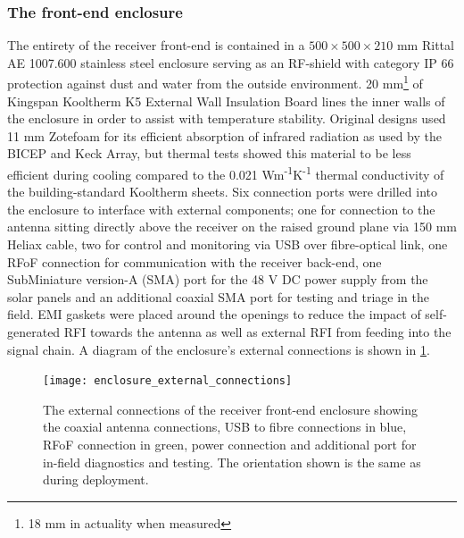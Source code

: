 \subsubsection{The front-end enclosure}
The entirety of the receiver front-end is contained in a $500 \times 500 \times 210$ mm Rittal AE 1007.600 stainless steel enclosure serving as an RF-shield with category IP 66 protection against dust and water from the outside environment. 20 mm\footnote{18 mm in actuality when measured} of Kingspan Kooltherm K5 External Wall Insulation Board lines the inner walls of the enclosure in order to assist with temperature stability. Original designs used 11 mm Zotefoam for its efficient absorption of infrared radiation as used by the BICEP and Keck Array, but thermal tests showed this material to be less efficient during cooling compared to the 0.021 Wm\textsuperscript{-1}K\textsuperscript{-1} thermal conductivity of the building-standard Kooltherm sheets. Six connection ports were drilled into the enclosure to interface with external components; one for connection to the antenna sitting directly above the receiver on the raised ground plane via 150 mm Heliax cable, two for control and monitoring via USB over fibre-optical link, one RFoF connection for communication with the receiver back-end, one SubMiniature version-A (SMA) port for the 48 V DC power supply from the solar panels and an additional coaxial SMA port for testing and triage in the field. EMI gaskets were placed around the openings to reduce the impact of self-generated RFI towards the antenna as well as external RFI from feeding into the signal chain. A diagram of the enclosure’s external connections is shown in \cref{fig:enclosure_external_connections}.
\begin{figure}
    \centering
    \texttt{[image: enclosure\_external\_connections]}
    \caption{The external connections of the receiver front-end enclosure showing the coaxial antenna connections, USB to fibre connections in blue, RFoF connection in green, power connection and additional port for in-field diagnostics and testing. The orientation shown is the same as during deployment.}
\label{fig:enclosure_external_connections}
\end{figure}

